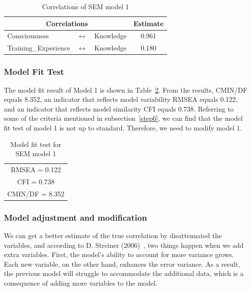 \begin{table}[h]
  \caption{Correlations of SEM model 1}
  \label{table14}
  \centering
  \begin{tabular}{lcl|c}
  \hline
   \multicolumn{3}{c|}{Correlations} & Estimate \\
  \hline
  Consciousness & $\longleftrightarrow$ & Knowledge & 0.961 \\
  Training\_Experience & $\longleftrightarrow$ & Knowledge & 0.180 \\
  \hline
  \end{tabular}
\end{table}
\cleardoublepage
\subsubsection{Model Fit Test}
The model fit result of Model 1 is shown in Table~\ref{table15}. From the results, CMIN/DF equals 8.352, an indicator that reflects model variability RMSEA equals 0.122, and an indicator that reflects model similarity CFI equals 0.738. Referring to some of the criteria mentioned in subsection~\ref{step6}, we can find that the model fit test of model 1 is not up to standard. Therefore, we need to modify model 1.

\begin{table}[h]
  \caption{Model fit test for SEM model 1}
  \label{table15}
  \centering 
  \begin{tabular}{|c|}
  \hline
  RMSEA = 0.122 \\
  CFI = 0.738 \\
  CMIN/DF = 8.352 \\
  \hline
  \end{tabular}
\end{table}

\subsubsection{Model adjustment and modification}

We can get a better estimate of the true correlation by disattenuated the variables, and according to D. Streiner (2006)~\cite{Streiner2006BuildingAB}, two things happen when we add extra variables. First, the model's ability to account for more variance grows. Each new variable, on the other hand, enhances the error variance. As a result, the previous model will struggle to accommodate the additional data, which is a consequence of adding more variables to the model. 

